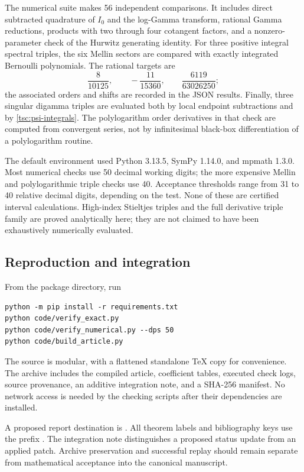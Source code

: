 The numerical suite makes 56 independent comparisons. It includes direct
subtracted quadrature of $I_0$ and the log-Gamma transform, rational Gamma
reductions, products with two through four cotangent factors, and a
nonzero-parameter check of the Hurwitz generating identity. For three
positive integral spectral triples, the six Mellin sectors are compared
with exactly integrated Bernoulli polynomials. The rational targets are
\begin{equation}\label{tsc:bernoulli-targets}
 \frac8{10125},\qquad -\frac{11}{15360},\qquad
 \frac{6119}{63026250};
\end{equation}
the associated orders and shifts are recorded in the JSON results.
Finally, three singular digamma triples are evaluated both by local
endpoint subtractions and by \eqref{tsc:psi-integrals}. The polylogarithm
order derivatives in that check are computed from convergent series,
not by infinitesimal black-box differentiation of a polylogarithm routine.

The default environment used Python 3.13.5, SymPy 1.14.0, and mpmath 1.3.0.
Most numerical checks use 50 decimal working digits; the more expensive
Mellin and polylogarithmic triple checks use 40. Acceptance thresholds range
from 31 to 40 relative decimal digits, depending on the test. None of these
are certified interval calculations. High-index Stieltjes triples and the
full derivative triple family are proved analytically here; they are not
claimed to have been exhaustively numerically evaluated.

\subsection{Reproduction and integration}
From the package directory, run
\begin{verbatim}
python -m pip install -r requirements.txt
python code/verify_exact.py
python code/verify_numerical.py --dps 50
python code/build_article.py
\end{verbatim}
The source is modular, with a flattened standalone TeX copy for convenience.
The archive includes the compiled article, coefficient tables, executed
check logs, source provenance, an additive integration note, and a SHA-256
manifest. No network access is needed by the checking scripts after their
dependencies are installed.

A proposed report destination is
.
All theorem labels and bibliography keys use the prefix .
The integration note distinguishes a proposed status update from an applied
patch. Archive preservation and successful replay should remain separate
from mathematical acceptance into the canonical manuscript.
